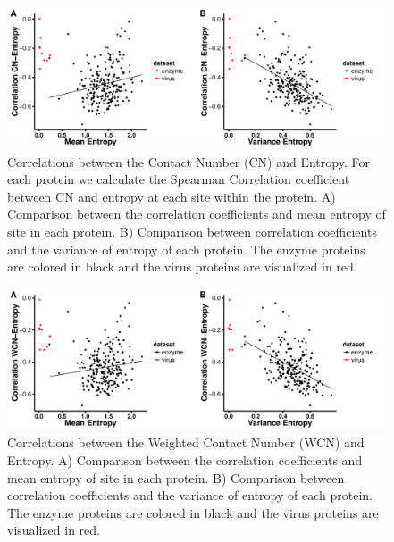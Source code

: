 \documentclass[12pt]{article}
\begin{document}
    \begin{figure}[H]
            \centerline{\includegraphics[width=7.5in]{entropy_cn_cor.pdf}}     
            \caption{Correlations between the Contact Number (CN) and Entropy. For each protein we calculate the Spearman Correlation coefficient between CN and entropy at each site within the protein. A) Comparison between the correlation coefficients and mean entropy of site in each protein. B) Comparison between correlation coefficients and the variance of entropy of each protein. The enzyme proteins are colored in black and the virus proteins are visualized in red. }
            \label{fig:entropy_cn_cor}
    \end{figure}

    \begin{figure}[H]
            \centerline{\includegraphics[width=7.5in]{entropy_wcn_cor.pdf}}     
            \caption{Correlations between the Weighted Contact Number (WCN) and Entropy. A) Comparison between the correlation coefficients and mean entropy of site in each protein. B) Comparison between correlation coefficients and the variance of entropy of each protein. The enzyme proteins are colored in black and the virus proteins are visualized in red.}
            \label{fig:entropy_wcn_cor}
    \end{figure}
\end{document}
